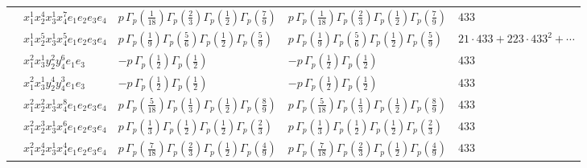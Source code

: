 \documentclass[11pt]{article}
\begin{document}
\begin{table}[ht]
{\begin{tabular}{@{}lllll@{}}
 & $x_{1}^{1} x_{2}^{4} x_{3}^{1} x_{4}^{7}  e_{1} e_{2} e_{3} e_{4}$ & $p \, \Gamma_p \left( \frac{1}{18} \right) \Gamma_p \left( \frac{2}{3} \right) \Gamma_p \left( \frac{1}{2} \right) \Gamma_p \left( \frac{7}{9} \right)$ & $p \, \Gamma_p \left( \frac{1}{18} \right) \Gamma_p \left( \frac{2}{3} \right) \Gamma_p \left( \frac{1}{2} \right) \Gamma_p \left( \frac{7}{9} \right)$ & $433$ \\
 & $x_{1}^{1} x_{2}^{5} x_{3}^{1} x_{4}^{5}  e_{1} e_{2} e_{3} e_{4}$ & $p \, \Gamma_p \left( \frac{1}{9} \right) \Gamma_p \left( \frac{5}{6} \right) \Gamma_p \left( \frac{1}{2} \right) \Gamma_p \left( \frac{5}{9} \right)$ & $p \, \Gamma_p \left( \frac{1}{9} \right) \Gamma_p \left( \frac{5}{6} \right) \Gamma_p \left( \frac{1}{2} \right) \Gamma_p \left( \frac{5}{9} \right)$ & $21{\cdot}433{+}223{\cdot}433^{2}{+}\cdots$ \\
 & $x_{1}^{2} x_{3}^{1} y_{2}^{2} y_{4}^{6} e_{1} e_{3}$ & $- p \, \Gamma_p \left( \frac{1}{2} \right) \Gamma_p \left( \frac{1}{2} \right)$ & $- p \, \Gamma_p \left( \frac{1}{2} \right) \Gamma_p \left( \frac{1}{2} \right)$ & $433$ \\
 & $x_{1}^{2} x_{3}^{1} y_{2}^{4} y_{4}^{3} e_{1} e_{3}$ & $- p \, \Gamma_p \left( \frac{1}{2} \right) \Gamma_p \left( \frac{1}{2} \right)$ & $- p \, \Gamma_p \left( \frac{1}{2} \right) \Gamma_p \left( \frac{1}{2} \right)$ & $433$ \\
 & $x_{1}^{2} x_{2}^{2} x_{3}^{1} x_{4}^{8}  e_{1} e_{2} e_{3} e_{4}$ & $p \, \Gamma_p \left( \frac{5}{18} \right) \Gamma_p \left( \frac{1}{3} \right) \Gamma_p \left( \frac{1}{2} \right) \Gamma_p \left( \frac{8}{9} \right)$ & $p \, \Gamma_p \left( \frac{5}{18} \right) \Gamma_p \left( \frac{1}{3} \right) \Gamma_p \left( \frac{1}{2} \right) \Gamma_p \left( \frac{8}{9} \right)$ & $433$ \\
 & $x_{1}^{2} x_{2}^{3} x_{3}^{1} x_{4}^{6}  e_{1} e_{2} e_{3} e_{4}$ & $p \, \Gamma_p \left( \frac{1}{3} \right) \Gamma_p \left( \frac{1}{2} \right) \Gamma_p \left( \frac{1}{2} \right) \Gamma_p \left( \frac{2}{3} \right)$ & $p \, \Gamma_p \left( \frac{1}{3} \right) \Gamma_p \left( \frac{1}{2} \right) \Gamma_p \left( \frac{1}{2} \right) \Gamma_p \left( \frac{2}{3} \right)$ & $433$ \\
 & $x_{1}^{2} x_{2}^{4} x_{3}^{1} x_{4}^{4}  e_{1} e_{2} e_{3} e_{4}$ & $p \, \Gamma_p \left( \frac{7}{18} \right) \Gamma_p \left( \frac{2}{3} \right) \Gamma_p \left( \frac{1}{2} \right) \Gamma_p \left( \frac{4}{9} \right)$ & $p \, \Gamma_p \left( \frac{7}{18} \right) \Gamma_p \left( \frac{2}{3} \right) \Gamma_p \left( \frac{1}{2} \right) \Gamma_p \left( \frac{4}{9} \right)$ & $433$ \\

\end{tabular}}
\end{table}
\end{document}
